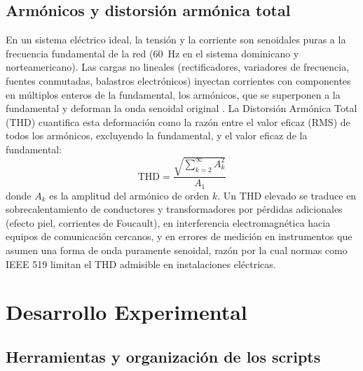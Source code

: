 \documentclass[conference]{IEEEtran}
\begin{document}
\subsection{Armónicos y distorsión armónica total}

En un sistema eléctrico ideal, la tensión y la corriente son senoidales puras a la frecuencia fundamental de la red (60~Hz en el sistema dominicano y norteamericano). Las cargas no lineales (rectificadores, variadores de frecuencia, fuentes conmutadas, balastros electrónicos) inyectan corrientes con componentes en múltiplos enteros de la fundamental, los armónicos, que se superponen a la fundamental y deforman la onda senoidal original \cite{proakis}. La Distorsión Armónica Total (THD) cuantifica esta deformación como la razón entre el valor eficaz (RMS) de todos los armónicos, excluyendo la fundamental, y el valor eficaz de la fundamental:
\begin{equation}
\text{THD} = \frac{\sqrt{\sum_{k=2}^{\infty} A_k^2}}{A_1}
\label{eq:thd}
\end{equation}
donde $A_k$ es la amplitud del armónico de orden $k$. Un THD elevado se traduce en sobrecalentamiento de conductores y transformadores por pérdidas adicionales (efecto piel, corrientes de Foucault), en interferencia electromagnética hacia equipos de comunicación cercanos, y en errores de medición en instrumentos que asumen una forma de onda puramente senoidal, razón por la cual normas como IEEE 519 limitan el THD admisible en instalaciones eléctricas.

\section{Desarrollo Experimental}

\subsection{Herramientas y organización de los scripts}
\end{document}
